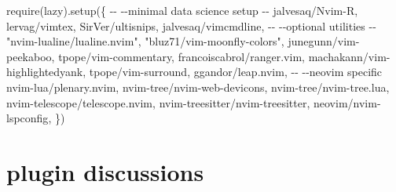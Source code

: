 \documentclass[
  letterpaper,
  DIV=11,
  numbers=noendperiod,
  oneside]{scrartcl}
\newenvironment{Shaded}{\begin{snugshade}}{\end{snugshade}}
\newcommand{\ErrorTok}[1]{\textcolor[rgb]{0.68,0.00,0.00}{#1}}
\newcommand{\ExtensionTok}[1]{\textcolor[rgb]{0.00,0.23,0.31}{#1}}
\newcommand{\KeywordTok}[1]{\textcolor[rgb]{0.00,0.23,0.31}{#1}}
\newcommand{\NormalTok}[1]{\textcolor[rgb]{0.00,0.23,0.31}{#1}}
\newcommand{\StringTok}[1]{\textcolor[rgb]{0.13,0.47,0.30}{#1}}
\begin{document}
\begin{Shaded}
\begin{Highlighting}[]






\ExtensionTok{require}\ErrorTok{(}\StringTok{\textquotesingle{}lazy\textquotesingle{}}\KeywordTok{)}\ExtensionTok{.setup}\ErrorTok{(}\KeywordTok{\{}
\ExtensionTok{{-}{-}}
\ExtensionTok{{-}{-}minimal}\NormalTok{ data science setup}
\ExtensionTok{{-}{-}}
\StringTok{\textquotesingle{}jalvesaq/Nvim{-}R\textquotesingle{}}\ExtensionTok{,}
\StringTok{\textquotesingle{}lervag/vimtex\textquotesingle{}}\ExtensionTok{,}
\StringTok{\textquotesingle{}SirVer/ultisnips\textquotesingle{}}\ExtensionTok{,}
\StringTok{\textquotesingle{}jalvesaq/vimcmdline\textquotesingle{}}\ExtensionTok{,}
\ExtensionTok{{-}{-}}
\ExtensionTok{{-}{-}optional}\NormalTok{ utilities}
\ExtensionTok{{-}{-}}
\StringTok{"nvim{-}lualine/lualine.nvim"}\ExtensionTok{,}
\StringTok{"bluz71/vim{-}moonfly{-}colors"}\ExtensionTok{,}
\StringTok{\textquotesingle{}junegunn/vim{-}peekaboo\textquotesingle{}}\ExtensionTok{,}
\StringTok{\textquotesingle{}tpope/vim{-}commentary\textquotesingle{}}\ExtensionTok{,}
\StringTok{\textquotesingle{}francoiscabrol/ranger.vim\textquotesingle{}}\ExtensionTok{,}
\StringTok{\textquotesingle{}machakann/vim{-}highlightedyank\textquotesingle{}}\ExtensionTok{,}
\StringTok{\textquotesingle{}tpope/vim{-}surround\textquotesingle{}}\ExtensionTok{,}
\StringTok{\textquotesingle{}ggandor/leap.nvim\textquotesingle{}}\ExtensionTok{,}
\ExtensionTok{{-}{-}}
\ExtensionTok{{-}{-}neovim}\NormalTok{ specific}
\StringTok{\textquotesingle{}nvim{-}lua/plenary.nvim\textquotesingle{}}\ExtensionTok{,}
\StringTok{\textquotesingle{}nvim{-}tree/nvim{-}web{-}devicons\textquotesingle{}}\ExtensionTok{,}
\StringTok{\textquotesingle{}nvim{-}tree/nvim{-}tree.lua\textquotesingle{}}\ExtensionTok{,}
\StringTok{\textquotesingle{}nvim{-}telescope/telescope.nvim\textquotesingle{}}\ExtensionTok{,}
\StringTok{\textquotesingle{}nvim{-}treesitter/nvim{-}treesitter\textquotesingle{}}\ExtensionTok{,}
\StringTok{\textquotesingle{}neovim/nvim{-}lspconfig\textquotesingle{}}\ExtensionTok{,}
\KeywordTok{\})}

\end{Highlighting}
\end{Shaded}

\section{plugin discussions}\label{plugin-discussions}
\end{document}

